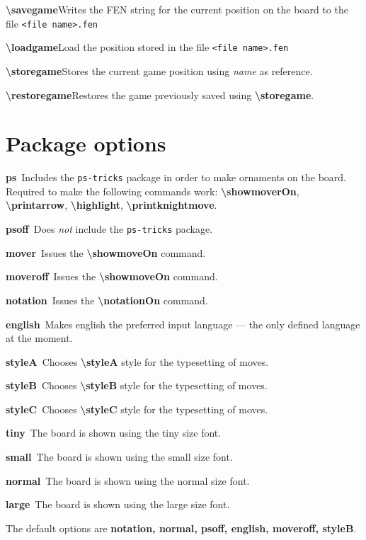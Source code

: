 \documentclass[10pt,a4paper,twocolumn,landscape]{article}
\newcommand{\Cmd}[1]{\textsf{\textbf{\textbackslash#1}}}
\newcommand{\Arg}[1]{\textsf{\textsl{#1}}}
\newcommand{\Option}[2]{\textsf{\textbf{#1}}\ #2\smallskip}
\newcommand{\ArgInDescription}[1]{\Arg{\{#1\}}}
\newcommand{\command}[3]{\Cmd{#1}\Apply{\ArgInDescription}{\Listize[#2]}\newline#3\smallskip}
\begin{document}
\command{savegame}{file name}
{Writes the FEN string for the current position on the board to the
  file \texttt{\textless file name\textgreater.fen}}

\command{loadgame}{file name} {Load the position stored in the file
  \texttt{\textless file name\textgreater.fen}}

\command{storegame}{name}
{Stores the current game position using \Arg{name} as reference.}

\command{restoregame}{name}
{Restores the game previously saved using \Cmd{storegame}.} 


\section{Package options}

\Option{ps}{Includes the \texttt{ps-tricks} package in order to make
  ornaments on the board. Required to make the following commands
  work: \Cmd{showmoverOn}, \Cmd{printarrow}, \Cmd{highlight},
  \Cmd{printknightmove}.}

\Option{psoff}{Does \emph{not} include the \texttt{ps-tricks} package.}

\Option{mover}{Issues the \Cmd{showmoveOn} command.}

\Option{moveroff}{Issues the \Cmd{showmoveOn} command.}

\Option{notation}{Issues the \Cmd{notationOn} command.}

\Option{english}{Makes english the preferred input language --- the
  only defined language at the moment.}

\Option{styleA}{Chooses \Cmd{styleA} style for the typesetting of
  moves.}

\Option{styleB}{Chooses \Cmd{styleB} style for the typesetting of
  moves.}

\Option{styleC}{Chooses \Cmd{styleC} style for the typesetting of
  moves.}

\newcommand{\sizeoption}[1]{\Option{#1}{The board is shown using the
    #1 size font.}}

\sizeoption{tiny}

\sizeoption{small}

\sizeoption{normal}

\sizeoption{large}

\bigskip

The default options are \textsf{\textbf{notation, normal, psoff,
    english, moveroff, styleB}}.
\end{document}
